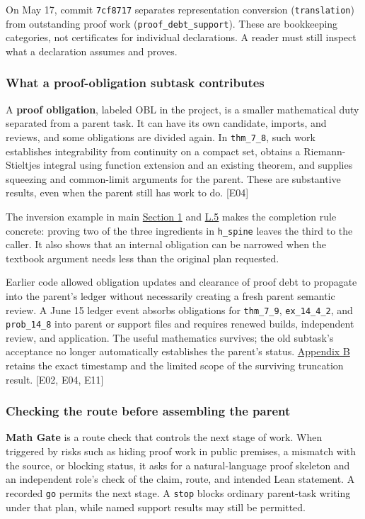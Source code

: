 On May 17, commit \nolinkurl{7cf8717} separates representation conversion (\nolinkurl{translation}) from outstanding proof work (\nolinkurl{proof_debt_support}). These are bookkeeping categories, not certificates for individual declarations. A reader must still inspect what a declaration assumes and proves.

\subsubsection[What a proof-obligation subtask contributes]{\texorpdfstring{\protect\hypertarget{l2-2}{}What a proof-obligation subtask contributes}{What a proof-obligation subtask contributes}}
A \textbf{proof obligation}, labeled OBL in the project, is a smaller mathematical duty separated from a parent task. It can have its own candidate, imports, and reviews, and some obligations are divided again. In \nolinkurl{thm_7_8}, such work establishes integrability from continuity on a compact set, obtains a Riemann-Stieltjes integral using function extension and an existing theorem, and supplies squeezing and common-limit arguments for the parent. These are substantive results, even when the parent still has work to do. [E04]

The inversion example in main \href{en.pdf\#section-1}{Section 1} and \hyperlink{l5}{L.5} makes the completion rule concrete: proving two of the three ingredients in \nolinkurl{h_spine} leaves the third to the caller. It also shows that an internal obligation can be narrowed when the textbook argument needs less than the original plan requested.

Earlier code allowed obligation updates and clearance of proof debt to propagate into the parent's ledger without necessarily creating a fresh parent semantic review. A June 15 ledger event absorbs obligations for \nolinkurl{thm_7_9}, \nolinkurl{ex_14_4_2}, and \nolinkurl{prob_14_8} into parent or support files and requires renewed builds, independent review, and application. The useful mathematics survives; the old subtask's acceptance no longer automatically establishes the parent's status. \hyperlink{appendix-b}{Appendix B} retains the exact timestamp and the limited scope of the surviving truncation result. [E02, E04, E11]

\subsubsection[Checking the route before assembling the parent]{\texorpdfstring{\protect\hypertarget{l2-3}{}Checking the route before assembling the parent}{Checking the route before assembling the parent}}
\textbf{Math Gate} is a route check that controls the next stage of work. When triggered by risks such as hiding proof work in public premises, a mismatch with the source, or blocking status, it asks for a natural-language proof skeleton and an independent role's check of the claim, route, and intended Lean statement. A recorded \nolinkurl{go} permits the next stage. A \nolinkurl{stop} blocks ordinary parent-task writing under that plan, while named support results may still be permitted.


